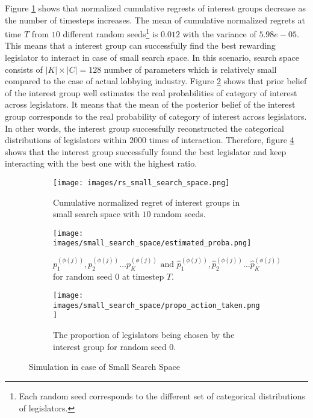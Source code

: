 \documentclass{article}
\begin{document}
Figure \ref{fig:rs_small} shows that 
normalized cumulative regrests of interest groups 
decrease as the number of timesteps increases.
The mean of cumulative normalized regrets at time $T$ from 
$10$ different random seeds\footnote{Each random seed  
corresponds to the different set of categorical distributions of legislators. 
} is $0.012$ with 
the variance of $5.98e-05$. 
This means that 
a interest group can successfully find the 
best rewarding legislator to interact in case of small search space.
In this scenario, search space consists of 
$|K| \times |C| = 128$ number of parameters 
which is relatively small compared to the case of 
actual lobbying industry.
Figure \ref{fig:smallproba} shows that 
prior belief of the interest group well 
estimates the real probabilities of category of interest across legislators. 
It means that the mean of the posterior belief of the interest group corresponds to the real probability of category of interest across legislators.
In other words, the interest group successfully
reconstructed the categorical distributions of legislators within $2000$ times of interaction.
Therefore, figure \ref{fig:smallpropo} shows that the interest group 
successfully found the best legislator and keep interacting 
with the best one with the highest ratio.

\begin{figure}[h!]  
    \centering %
    \begin{subfigure}[b]{0.45\textwidth}
        \texttt{[image: images/rs\_small\_search\_space.png]}
        \caption{Cumulative normalized regret of interest groups in small search space with $10$ random seeds.}
        \label{fig:rs_small}
    \end{subfigure}
    \begin{subfigure}[b]{0.5\textwidth}
        \texttt{[image: images/small\_search\_space/estimated\_proba.png]}
        \caption{$p_1^{(\phi(j))}, p_2^{(\phi(j))} \hdots p_K^{(\phi(j))} \text{ and } \hat{p}_1^{(\phi(j))}, \hat{p}_2^{(\phi(j))} \hdots \hat{p}_K^{(\phi(j))}$ for random seed $0$ at timestep $T$.}
        \label{fig:smallproba}
    \end{subfigure}

    \begin{subfigure}[b]{1\columnwidth}
        \centering
        \texttt{[image: images/small\_search\_space/propo\_action\_taken.png]}
        \caption{The proportion of legislators being chosen by the interest group for random seed $0$.}
        \label{fig:smallpropo}
    \end{subfigure}
    \caption{Simulation in case of Small Search Space}
\end{figure}
    
\end{document}
